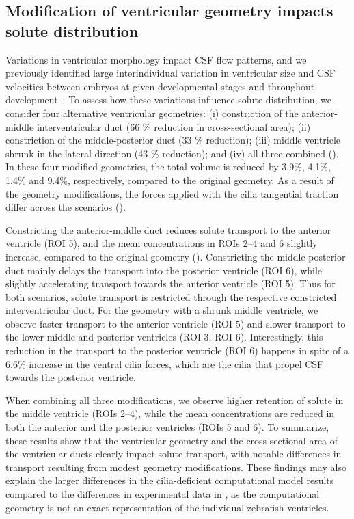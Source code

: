 \documentclass{WileyMSP-template}
\begin{document}
\subsection{Modification of ventricular geometry impacts solute distribution}
Variations in ventricular morphology impact CSF flow
patterns, and we previously identified large
interindividual variation in ventricular size and
CSF velocities between embryos at given developmental stages and throughout
development~\cite{Olstad2019CiliaryDevelopment, DGama2025MotileBrain, Jeong2024TheZebrafish}.
To assess how these
variations influence solute distribution, we consider four alternative
ventricular geometries: (i) constriction of the anterior-middle
interventricular duct (66 \% reduction in cross-sectional area);
(ii) constriction of the middle-posterior duct (33 \% reduction);
(iii) middle ventricle shrunk in the lateral direction (43 \% reduction);
and (iv) all three combined ().
In these four modified geometries, the total volume is reduced by
3.9\%, 4.1\%, 1.4\% and 9.4\%, respectively, compared to the original
geometry. As a result of the geometry modifications,
the forces applied with the 
cilia tangential traction differ across the scenarios
().

Constricting the anterior-middle duct
reduces solute transport to the anterior ventricle (ROI 5), and the
mean concentrations in ROIs 2--4 and 6 slightly increase, compared to
the original geometry ().
Constricting the middle-posterior duct
mainly delays the transport into the posterior ventricle (ROI 6),
while slightly accelerating transport towards the anterior
ventricle (ROI 5). 
Thus for both scenarios, solute transport is restricted through
the respective constricted interventricular duct.
For the geometry with a shrunk middle
ventricle, we observe faster transport
to the anterior ventricle (ROI 5)
and slower transport to the lower middle 
and posterior ventricles (ROI 3, ROI 6). 
Interestingly, this reduction in the transport to the
posterior ventricle (ROI 6) happens in spite of a 6.6\% increase in
the ventral cilia forces, which are the cilia that propel
CSF towards the posterior ventricle.

When combining all three modifications,
we observe higher retention of solute in the middle ventricle (ROIs 2--4),
while the mean concentrations are reduced in both the anterior
and the posterior ventricles (ROIs 5 and 6).
To summarize, these results show that the ventricular geometry and the
cross-sectional area of the ventricular ducts clearly impact solute
transport, with notable differences in transport resulting from modest
geometry modifications. These findings may also explain the larger
differences in the cilia-deficient computational model results
compared to the differences in experimental data in ,
as the computational geometry is not an exact representation of the
individual zebrafish ventricles.
\end{document}
